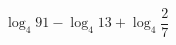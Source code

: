 \begin{ex}[type=calculate]
	\begin{condition}
		\( \log_4 91 - \log_4 13 + \log_4 \dfrac{2}{7} \)
	\end{condition}
\end{ex}